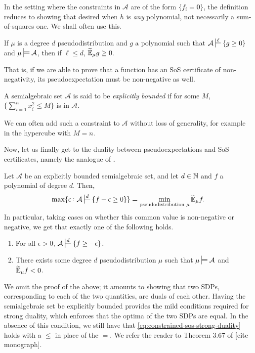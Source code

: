In the setting where the constraints in $\mathcal{A}$ are of the form $\{f_i = 0\}$, the definition reduces to showing that desired when $h$ is \emph{any} polynomial, not necessarily a sum-of-squares one. We shall often use this.

\begin{fprop}
	If $\mu$ is a degree $d$ pseudodistribution and $g$ a polynomial such that $\mathcal{A} \sststile{}{\ell} \{g \ge 0\}$ and $\mu \sdtstile{}{} \mathcal{A}$, then if $\ell \le d$, $\widetilde{\mathbb{E}}_\mu g \ge 0$.
\end{fprop}

That is, if we are able to prove that a function has an SoS certificate of non-negativity, its pseudoexpectation must be non-negative as well.

\begin{definition}
	A semialgebraic set $\mathcal{A}$ is said to be \emph{explicitly bounded} if for some $M$, $\{\sum_{i=1}^n x_i^2 \le M\}$ is in $\mathcal{A}$.
\end{definition}
We can often add such a constraint to $\mathcal{A}$ without loss of generality, for example in the hypercube with $M=n$.

Now, let us finally get to the duality between pseudoexpectations and SoS certificates, namely the analogue of .

\begin{ftheo}
	\label{constrained-sos-duality}
	Let $\mathcal{A}$ be an explicitly bounded semialgebraic set, and let $d \in \mathbb{N}$ and $f$ a polynomial of degree $d$. Then,
	\begin{equation}
		\label{eq:constrained-sos-strong-duality}
		\max \{ \epsilon : \mathcal{A} \sststile{}{d} \{f-\epsilon \ge 0\} \} = \min_{\text{pseudodistribution }\mu} \pE_\mu f.
	\end{equation}
	In particular, taking cases on whether this common value is non-negative or negative, we get that exactly one of the following holds.
	\begin{enumerate}[label=(\alph*)]
		\item For all $\epsilon > 0$, $\mathcal{A} \sststile{}{d} \{f \ge -\epsilon\}$.
		\item There exists some degree $d$ pseudodistribution $\mu$ such that $\mu \sdtstile{}{} \mathcal{A}$ and $\widetilde{\mathbb{E}}_\mu f < 0$.
	\end{enumerate}
\end{ftheo}
We omit the proof of the above; it amounts to showing that two SDPs, corresponding to each of the two quantities, are duals of each other. Having the semialgebraic set be explicitly bounded provides the mild conditions required for strong duality, which enforces that the optima of the two SDPs are equal. In the absence of this condition, we still have that \cref{eq:constrained-sos-strong-duality} holds with a $\le$ in place of the $=$. We refer the reader to Theorem 3.67 of [cite monograph].

